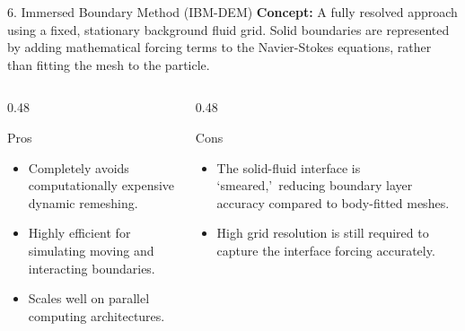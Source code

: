 \begin{frame}{6. Immersed Boundary Method (IBM-DEM)}
    \textbf{Concept:} A fully resolved approach using a fixed, stationary background fluid grid. Solid boundaries are represented by adding mathematical forcing terms to the Navier-Stokes equations, rather than fitting the mesh to the particle.
    \vspace{0.3cm}
    
    \begin{columns}[T]
        \begin{column}{0.48\textwidth}
            \begin{block}{Pros}
                \begin{itemize}
                    \item Completely avoids computationally expensive dynamic remeshing.
                    \item Highly efficient for simulating moving and interacting boundaries.
                    \item Scales well on parallel computing architectures.
                \end{itemize}
            \end{block}
        \end{column}
        
        \begin{column}{0.48\textwidth}
            \begin{alertblock}{Cons}
                \begin{itemize}
                    \item The solid-fluid interface is \lq smeared,\rq\ reducing boundary layer accuracy compared to body-fitted meshes.
                    \item High grid resolution is still required to capture the interface forcing accurately.
                \end{itemize}
            \end{alertblock}
        \end{column}
    \end{columns}
   
\end{frame}

